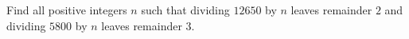 Find all positive integers $n$ such that dividing $12650$ by $n$ leaves remainder $2$ and dividing $5800$ by $n$ leaves remainder $3$.
